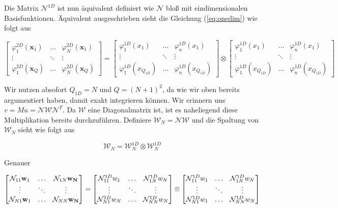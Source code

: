 Die Matrix $\mathcal{N}^{1D}$ ist nun äquivalent definiert wie $\mathcal{N}$ bloß mit eindimensionalen Basisfunktionen. Äquivalent ausgeschrieben sieht die Gleichung (\ref{eq:onedim}) wie folgt aus

\begin{equation*}
\begin{bmatrix}
\varphi^{2D}_1(\bm{x}_1) & \hdots & \varphi^{2D}_N(\bm{x}_1) \\
\vdots & \ddots & \vdots \\
\varphi^{2D}_1(\bm{x}_Q) & \hdots & \varphi^{2D}_N(\bm{x}_Q)
\end{bmatrix}
=
\begin{bmatrix}
\varphi^{1D}_1(x_1) & \hdots & \varphi^{1D}_n(x_1) \\
\vdots & \ddots & \vdots \\
\varphi^{1D}_1(x_{Q_{1D}}) & \hdots & \varphi^{1D}_n(x_{Q_{1D}})
\end{bmatrix}
\otimes
\begin{bmatrix}
\varphi^{1D}_1(x_1) & \hdots & \varphi^{1D}_n(x_1) \\
\vdots & \ddots & \vdots \\
\varphi^{1D}_1(x_{Q_{1D}}) & \hdots & \varphi^{1D}_n(x_{Q_{1D}})
\end{bmatrix}
\end{equation*}

Wir nutzen absofort $Q_{1D}=N$ und $Q=(N+1)^2$, da wie wir oben bereits argumentiert haben, damit exakt integrieren können.
Wir erinnern uns $v=Mu=\mathcal{N} \mathcal{W} \mathcal{N}^T$. Da $\mathcal{W}$ eine Diagonalmatrix ist, ist es naheliegend diese Multiplikation bereits durchzuführen. Definiere $\mathcal{W}_{N}=\mathcal{N} \mathcal{W}$ und die Spaltung von $\mathcal{W}_N$ sieht wie folgt aus

\begin{equation}
\mathcal{W}_N = \mathcal{W}_N^{1D} \otimes \mathcal{W}_N^{1D}
\end{equation}

Genauer

\begin{equation*}
\begin{bmatrix}
\mathcal{N}_{11} \bold{w}_1 & \hdots & \mathcal{N}_{1N} \bold{w_N} \\
\vdots & \ddots & \vdots \\
\mathcal{N}_{N1} \bold{w}_1 & \hdots & \mathcal{N}_{NN} \bold{w_N}
\end{bmatrix}
= 
\begin{bmatrix}
\mathcal{N}_{11}^{1D} w_1 & \hdots & \mathcal{N}_{1N}^{1D} w_N \\
\vdots & \ddots & \vdots \\
\mathcal{N}_{N1}^{1D} w_N & \hdots & \mathcal{N}_{NN}^{1D} w_N
\end{bmatrix}
\otimes
\begin{bmatrix}
\mathcal{N}_{11}^{1D} w_1 & \hdots & \mathcal{N}_{1N}^{1D} w_N \\
\vdots & \ddots & \vdots \\
\mathcal{N}_{N1}^{1D} w_1 & \hdots & \mathcal{N}_{NN}^{1D}w_N
\end{bmatrix}
\end{equation*}

